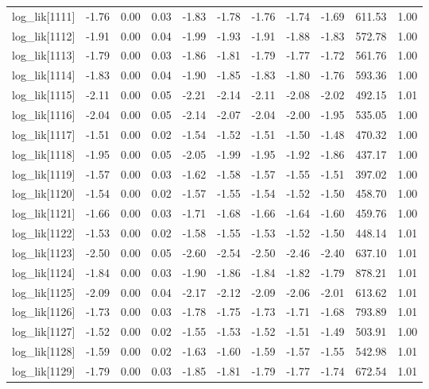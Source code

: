 \begin{table}[ht]
\begin{tabular}{rrrrrrrrrrr}
  log\_lik[1111] & -1.76 & 0.00 & 0.03 & -1.83 & -1.78 & -1.76 & -1.74 & -1.69 & 611.53 & 1.00 \\ 
  log\_lik[1112] & -1.91 & 0.00 & 0.04 & -1.99 & -1.93 & -1.91 & -1.88 & -1.83 & 572.78 & 1.00 \\ 
  log\_lik[1113] & -1.79 & 0.00 & 0.03 & -1.86 & -1.81 & -1.79 & -1.77 & -1.72 & 561.76 & 1.00 \\ 
  log\_lik[1114] & -1.83 & 0.00 & 0.04 & -1.90 & -1.85 & -1.83 & -1.80 & -1.76 & 593.36 & 1.00 \\ 
  log\_lik[1115] & -2.11 & 0.00 & 0.05 & -2.21 & -2.14 & -2.11 & -2.08 & -2.02 & 492.15 & 1.01 \\ 
  log\_lik[1116] & -2.04 & 0.00 & 0.05 & -2.14 & -2.07 & -2.04 & -2.00 & -1.95 & 535.05 & 1.00 \\ 
  log\_lik[1117] & -1.51 & 0.00 & 0.02 & -1.54 & -1.52 & -1.51 & -1.50 & -1.48 & 470.32 & 1.00 \\ 
  log\_lik[1118] & -1.95 & 0.00 & 0.05 & -2.05 & -1.99 & -1.95 & -1.92 & -1.86 & 437.17 & 1.00 \\ 
  log\_lik[1119] & -1.57 & 0.00 & 0.03 & -1.62 & -1.58 & -1.57 & -1.55 & -1.51 & 397.02 & 1.00 \\ 
  log\_lik[1120] & -1.54 & 0.00 & 0.02 & -1.57 & -1.55 & -1.54 & -1.52 & -1.50 & 458.70 & 1.00 \\ 
  log\_lik[1121] & -1.66 & 0.00 & 0.03 & -1.71 & -1.68 & -1.66 & -1.64 & -1.60 & 459.76 & 1.00 \\ 
  log\_lik[1122] & -1.53 & 0.00 & 0.02 & -1.58 & -1.55 & -1.53 & -1.52 & -1.50 & 448.14 & 1.01 \\ 
  log\_lik[1123] & -2.50 & 0.00 & 0.05 & -2.60 & -2.54 & -2.50 & -2.46 & -2.40 & 637.10 & 1.01 \\ 
  log\_lik[1124] & -1.84 & 0.00 & 0.03 & -1.90 & -1.86 & -1.84 & -1.82 & -1.79 & 878.21 & 1.01 \\ 
  log\_lik[1125] & -2.09 & 0.00 & 0.04 & -2.17 & -2.12 & -2.09 & -2.06 & -2.01 & 613.62 & 1.01 \\ 
  log\_lik[1126] & -1.73 & 0.00 & 0.03 & -1.78 & -1.75 & -1.73 & -1.71 & -1.68 & 793.89 & 1.01 \\ 
  log\_lik[1127] & -1.52 & 0.00 & 0.02 & -1.55 & -1.53 & -1.52 & -1.51 & -1.49 & 503.91 & 1.00 \\ 
  log\_lik[1128] & -1.59 & 0.00 & 0.02 & -1.63 & -1.60 & -1.59 & -1.57 & -1.55 & 542.98 & 1.01 \\ 
  log\_lik[1129] & -1.79 & 0.00 & 0.03 & -1.85 & -1.81 & -1.79 & -1.77 & -1.74 & 672.54 & 1.01 \\ 

\end{tabular}
\end{table}
